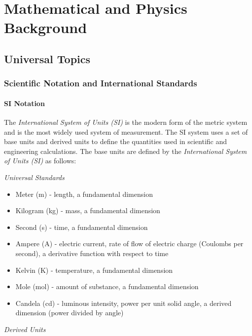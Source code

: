 \chapter{Mathematical and Physics Background}

\section{Universal Topics}

\subsection{Scientific Notation and International Standards}

\subsubsection{SI Notation}

The \emph{International System of Units (SI)} is the modern form of the metric system and is the most widely used system of measurement. 
The SI system uses a set of base units and derived units to define the quantities used in scientific and engineering calculations. 
The base units are defined by the \emph{International System of Units (SI)} as follows: 

\emph{Universal Standards}

\begin{itemize} 
  \item Meter (m) - length, a fundamental dimension
  \item Kilogram (kg) - mass, a fundamental dimension
  \item Second (s) - time, a fundamental dimension
  \item Ampere (A) - electric current, rate of flow of electric charge (Coulombs per second), a derivative function with respect to time
  \item Kelvin (K) - temperature, a fundamental dimension
  \item Mole (mol) - amount of substance, a fundamental dimension
  \item Candela (cd) - luminous intensity, power per unit solid angle, a derived dimension (power divided by angle)
\end{itemize}

\emph{Derived Units}

